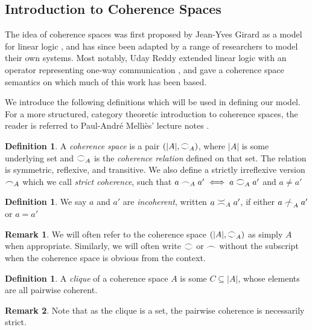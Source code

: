 \documentclass[12pt, oneside]{article}
\theoremstyle{plain}
\theoremstyle{definition}
\newtheorem{definition}[theorem]{Definition}
\newtheorem*{remark}{Remark}
\newcommand{\coh}[1][]{\mathrel{\vcenter{\offinterlineskip\hbox{$\frown$}\vskip0.2ex\hbox{$\smile$}}_{\ifx\\#1\\\else#1\fi}}}
\newcommand{\incoh}[1][]{\mathrel{\vcenter{\offinterlineskip\hbox{$\smile$}\vskip0.2ex\hbox{$\frown$}}_{\ifx\\#1\\\else#1\fi}}}
\newcommand{\scoh}[1][]{\mathrel{\frown}_{\ifx\\#1\\\else#1\fi}}
\newcommand{\notscoh}[1][]{\mathrel{\ooalign{$\frown$\cr\hidewidth$/$\hidewidth}}_{\ifx\\#1\\\else#1\fi}}
\begin{document}
\subsection{Introduction to Coherence Spaces}
The idea of coherence spaces was first proposed by Jean-Yves Girard as a model for linear logic \cite{girard1987linear}, and has since been adapted by a range of researchers to model their own systems.
Most notably, Uday Reddy extended linear logic with an operator representing one-way communication \cite{reddy1993all}, and gave a coherence space semantics on which much of this work has been based.

We introduce the following definitions which will be used in defining our model.
For a more structured, category theoretic introduction to coherence spaces, the reader is referred to Paul-André Melliès' lecture notes \cite{mellies2000survival}.

\begin{definition}
    A \textit{coherence space} is a pair $(|A|,\coh[A])$, where $|A|$ is some underlying set and $\coh[A]$ is the \textit{coherence relation} defined on that set.
    The relation is symmetric, reflexive, and transitive.
    We also define a strictly irreflexive version $\scoh[A]$ which we call \textit{strict coherence}, such that $a\scoh[A]a' \iff a\coh[A]a'$ and $a\not=a'$
\end{definition}

\begin{definition}
    We say $a$ and $a'$ are \textit{incoherent}, written $a \incoh[A] a'$, if either $a \notscoh[A] a'$ or $a=a'$
\end{definition}

\begin{remark}
    We will often refer to the coherence space $(|A|,\coh[A])$ as simply $A$ when appropriate.
    Similarly, we will often write $\coh$ or $\scoh$ without the subscript when the coherence space is obvious from the context.
\end{remark}

\begin{definition}
    A \textit{clique} of a coherence space $A$ is some $C \subseteq |A|$, whose elements are all pairwise coherent.
\end{definition}

\begin{remark}
    Note that as the clique is a set, the pairwise coherence is necessarily strict.
\end{remark}
\end{document}
